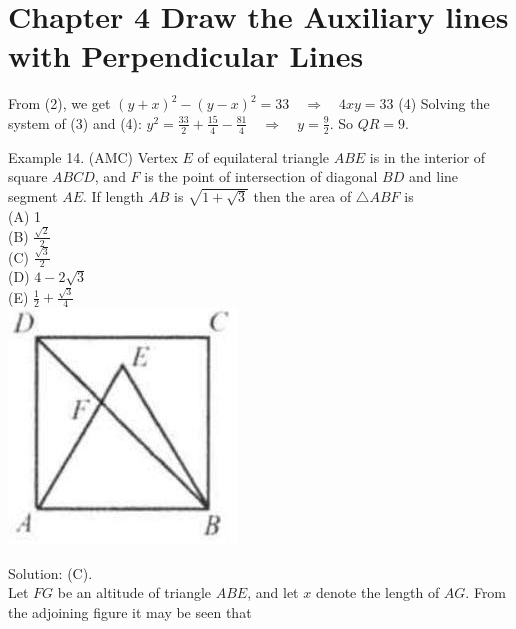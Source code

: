 \documentclass[10pt]{article}
\begin{document}
\section*{Chapter 4 Draw the Auxiliary lines with Perpendicular Lines}
From (2), we get \((y+x)^{2}-(y-x)^{2}=33 \quad \Rightarrow \quad 4 x y=33\) (4) Solving the system of (3) and (4): \(y^{2}=\frac{33}{2}+\frac{15}{4}-\frac{81}{4} \quad \Rightarrow \quad y=\frac{9}{2}\). So \(Q R=9\).

Example 14. (AMC) Vertex \(E\) of equilateral triangle \(A B E\) is in the interior of square \(A B C D\), and \(F\) is the point of intersection of diagonal \(B D\) and line segment \(A E\). If length \(A B\) is \(\sqrt{1+\sqrt{3}}\) then the area of \(\triangle A B F\) is\\
(A) 1\\
(B) \(\frac{\sqrt{2}}{2}\)\\
(C) \(\frac{\sqrt{3}}{2}\)\\
(D) \(4-2 \sqrt{3}\)\\
(E) \(\frac{1}{2}+\frac{\sqrt{3}}{4}\)\\
\includegraphics[max width=\textwidth, center]{2025_04_17_97bc1f7e44d93c271a88g-083}

Solution: (C).\\
Let \(F G\) be an altitude of triangle \(A B E\), and let \(x\) denote the length of \(A G\). From the adjoining figure it may be seen that
\end{document}

